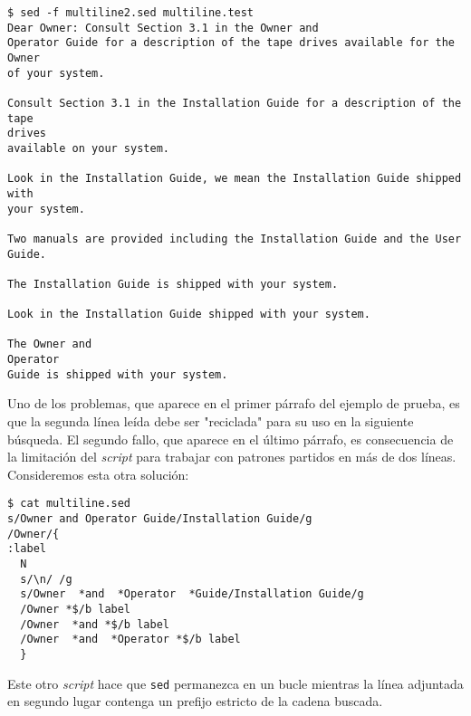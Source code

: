 \begin{verbatim}
$ sed -f multiline2.sed multiline.test
Dear Owner: Consult Section 3.1 in the Owner and
Operator Guide for a description of the tape drives available for the Owner
of your system.
 
Consult Section 3.1 in the Installation Guide for a description of the tape
drives
available on your system.
 
Look in the Installation Guide, we mean the Installation Guide shipped with
your system.
 
Two manuals are provided including the Installation Guide and the User Guide.
 
The Installation Guide is shipped with your system.
 
Look in the Installation Guide shipped with your system.
 
The Owner and
Operator
Guide is shipped with your system.  
\end{verbatim}
Uno de los problemas, que aparece en el primer párrafo del
ejemplo de prueba, es que la segunda línea leída debe ser
"reciclada"
para su uso en la siguiente búsqueda. El segundo fallo, 
que aparece en el último párrafo, es consecuencia de la
limitación del {\it script} para trabajar con  patrones partidos
en más de dos líneas.\\
Consideremos esta otra solución:
\begin{verbatim}
$ cat multiline.sed
s/Owner and Operator Guide/Installation Guide/g
/Owner/{
:label
  N
  s/\n/ /g
  s/Owner  *and  *Operator  *Guide/Installation Guide/g
  /Owner *$/b label
  /Owner  *and *$/b label
  /Owner  *and  *Operator *$/b label
  }                       
\end{verbatim}
Este otro {\it script} hace que {\tt sed} permanezca en un bucle mientras
la línea adjuntada en segundo lugar contenga un prefijo estricto 
de la cadena buscada. 

